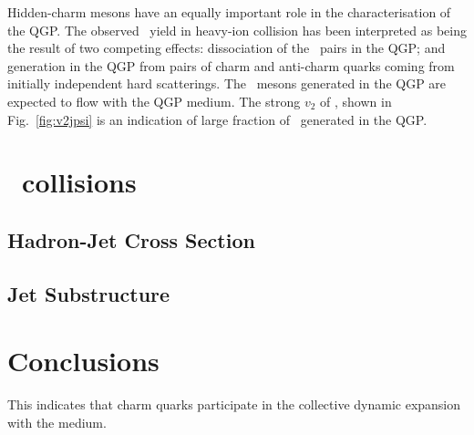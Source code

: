 \documentclass[10pt]{article}
\def\Acknowledgements{\bigskip  \bigskip \begin{center} \begin{large}
             \bf ACKNOWLEDGEMENTS \end{large}\end{center}}
\begin{document}
Hidden-charm mesons have an equally important role in the characterisation of the QGP.
The observed \jpsi\ yield in heavy-ion collision has been interpreted as being the result of two competing effects: dissociation of the \ccbar\ pairs in the QGP; and generation in the QGP from pairs of charm and anti-charm quarks coming from initially independent hard scatterings.
The \jpsi\ mesons generated in the QGP are expected to flow with the QGP medium. The strong $v_2$ of \jpsi, shown in Fig.~\ref{fig:v2jpsi} is an indication of large fraction of \jpsi\ generated in the QGP.

\section{\pPb\ collisions}

\subsection{Hadron-Jet Cross Section}

\subsection{Jet Substructure}

\section{Conclusions}
This indicates
that charm quarks participate in the collective dynamic expansion with the medium.
 




{}

 
\end{document}
